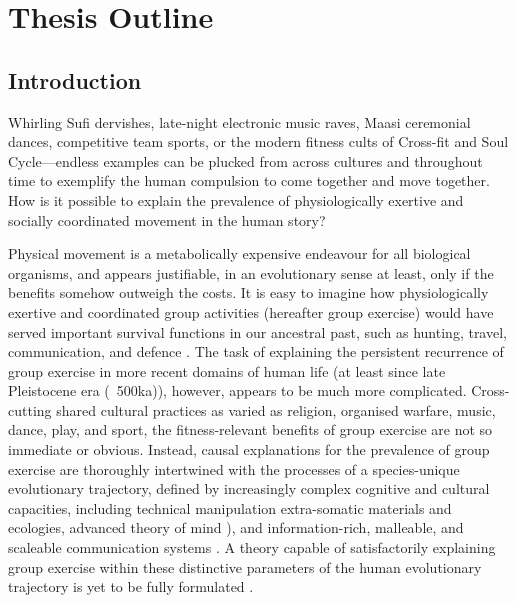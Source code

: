 \chapter{\label{introduction}Thesis Outline}



\section{Introduction}
Whirling Sufi dervishes, late-night electronic music raves, Maasi ceremonial dances, competitive team sports, or the modern fitness cults of Cross-fit and Soul Cycle---endless examples can be plucked from across cultures and throughout time to exemplify the human compulsion to come together and move together.  How is it possible to explain the prevalence of physiologically exertive and socially coordinated movement in the human story?

Physical movement is a metabolically expensive endeavour for all biological organisms,  and appears justifiable, in an evolutionary sense at least, only if the benefits somehow outweigh the costs.  It is easy to imagine how physiologically exertive and coordinated group activities (hereafter group exercise) would have served important survival functions in our ancestral past, such as hunting, travel, communication, and defence \citep{Sands2010}.  The task of explaining the persistent recurrence of group exercise in more recent domains of human life (at least since late Pleistocene era (~500ka)), however, appears to be much more complicated.  Cross-cutting shared cultural practices as varied as religion, organised warfare, music, dance, play, and sport, the fitness-relevant benefits of group exercise are not so immediate or obvious.  Instead, causal explanations for the prevalence of group exercise are thoroughly intertwined with the processes of a  species-unique evolutionary trajectory, defined by increasingly complex cognitive and cultural capacities, including technical manipulation extra-somatic materials and ecologies, advanced theory of mind \citep{Tomasello1999}), and information-rich, malleable, and scaleable communication systems \citep{Fuentes2016}.  A theory capable of satisfactorily explaining group exercise within these distinctive parameters of the human evolutionary trajectory is yet to be fully formulated \citep{Cohen2017}.

